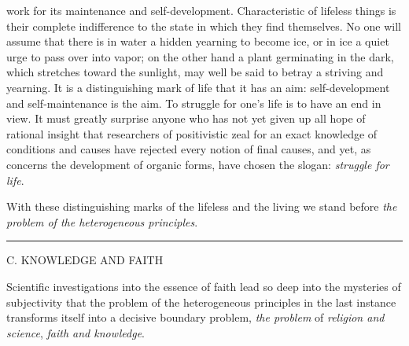 \documentclass[12pt,a4paper,openany]{book}
\newcommand{\excerpthead}[1]{\par\bigskip\begin{center}#1\end{center}\nopagebreak\smallskip}
\newcommand{\sectionrule}{\par\begin{center}\rule{4em}{0.4pt}\end{center}}
\begin{document}
work for its maintenance and self-development. Characteristic of lifeless things is
their complete indifference to the state in which they find themselves. No one will
assume that there is in water a hidden yearning to become ice, or in ice a quiet urge
to pass over into vapor; on the other hand a plant germinating in the dark, which
stretches toward the sunlight, may well be said to betray a striving and yearning. It
is a distinguishing mark of life that it has an aim: self-development and
self-maintenance is the aim. To struggle for one's life is to have an end in view. It
must greatly surprise anyone who has not yet given up all hope of rational insight
that researchers of positivistic zeal for an exact knowledge of conditions and causes
have rejected every notion of final causes, and yet, as concerns the development of
organic forms, have chosen the slogan: \emph{struggle for life}.

With these distinguishing marks of the lifeless and the living we stand before
\emph{the problem of the heterogeneous principles}.

\sectionrule

\excerpthead{C. KNOWLEDGE AND FAITH}


Scientific investigations into the essence of faith lead so deep into the mysteries of
subjectivity that the problem of the heterogeneous principles in the last instance
transforms itself into a decisive boundary problem, \emph{the problem} of
\emph{religion and} \emph{science}, \emph{faith and knowledge}.
\end{document}
